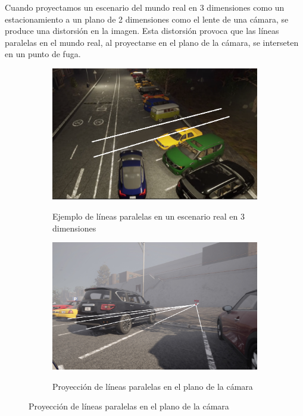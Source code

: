 \noindent
Cuando proyectamos un escenario del mundo real en 3 dimensiones como un estacionamiento a un plano de 2 dimensiones como el lente de una cámara, se produce una distorsión en la imagen.
Esta distorsión provoca que las líneas paralelas en el mundo real, al proyectarse en el plano de la cámara, se interseten en un punto de fuga.

\begin{figure}[!ht]
    \centering
    \begin{subfigure}{0.4\textwidth}
        \includegraphics[width=\textwidth]{img/reticule/paralel_lines}\label {fig:parallel_lines}
        \caption{Ejemplo de líneas paralelas en un escenario real en 3 dimensiones}
    \end{subfigure}
    \begin{subfigure}{0.4\textwidth}
        \includegraphics[width=\textwidth]{img/reticule/pov}\label {fig:pov}
        \caption{Proyección de líneas paralelas en el plano de la cámara}
    \end{subfigure}

    \label{fig:distorion}
\end{figure}


